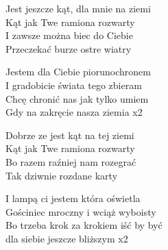 \begin{text}
    Jest jeszcze kąt, dla mnie na ziemi\\
    Kąt jak Twe ramiona rozwarty\\
    I zawsze można biec do Ciebie\\
    Przeczekać burze ostre wiatry

    \vin Jestem dla Ciebie piorunochronem\\
    \vin I gradobicie świata tego zbieram\\
    \vin Chcę chronić nas jak tylko umiem\\
    \vin Gdy na zakręcie nasza ziemia x2

    Dobrze ze jest kąt na tej ziemi\\
    Kąt jak Twe ramiona rozwarty\\
    Bo razem raźniej nam rozegrać\\
    Tak dziwnie rozdane karty

    \vin I lampą ci jestem która oświetla\\
    \vin Gościniec mroczny i wciąż wyboisty\\
    \vin Bo trzeba krok za krokiem iść by być\\
    \vin dla siebie jeszcze bliższym x2
\end{text}
\begin{chord}

\end{chord}